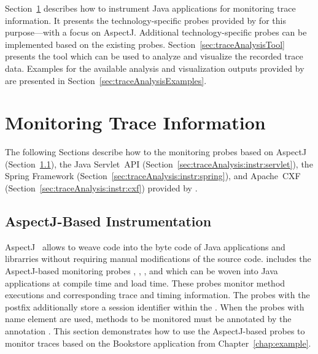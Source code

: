 \enlargethispage{1cm}

\noindent Section~\ref{sec:traceMonitoring} describes how to instrument Java %
applications for monitoring trace information. %
It presents the technology-specific probes provided by \Kieker{} for this %
purpose---with a focus on AspectJ. %
Additional technology-specific probes can be implemented based on the existing %
probes. %
Section~\ref{sec:traceAnalysisTool} presents the %
tool which can be used to analyze and visualize the recorded trace %
data.  Examples for the available analysis and visualization outputs %
provided by \KiekerTraceAnalysis{} are presented in %
Section~\ref{sec:traceAnalysisExamples}.

\section{Monitoring Trace Information}\label{sec:traceMonitoring}

The following Sections describe how to the monitoring probes based on %
AspectJ (Section~\ref{sec:traceAnalysis:instr:AspectJ}), %
the Java Servlet~API (Section~\ref{sec:traceAnalysis:instr:servlet}), %
the Spring Framework (Section~\ref{sec:traceAnalysis:instr:spring}), and %
Apache~CXF (Section~\ref{sec:traceAnalysis:instr:cxf}) provided %
by \Kieker{}. %

\subsection{AspectJ-Based Instrumentation}\label{sec:traceAnalysis:instr:AspectJ}

AspectJ~\cite{AspectJ-WebSite} allows to weave code into the byte code of %
Java applications and librarries without requiring manual modifications of the %
source code. %
\Kieker{} includes the AspectJ-based monitoring probes %
, %
, %
, and %
which can be woven into Java applications at compile time and load time. %
These probes monitor method executions and corresponding %
trace and timing information. The probes with the postfix  %
additionally store a session identifier within the . %
When the probes with name element  are used, %
methods to be monitored must be annotated by the \Kieker{} %
annotation . %
This section demonstrates how to use the AspectJ-based probes to monitor %
traces based on the Bookstore application from Chapter~\ref{chap:example}. %

